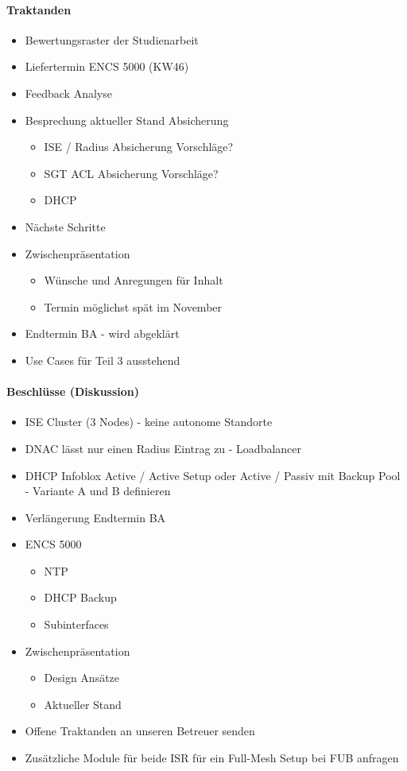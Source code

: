 \paragraph{Traktanden}
\begin{itemize}	
	\item Bewertungsraster der Studienarbeit
	\item Liefertermin ENCS 5000 (KW46)
	\item Feedback Analyse
	\item Besprechung aktueller Stand Absicherung
	\begin{itemize}
		\item ISE / Radius Absicherung Vorschläge?
		\item SGT ACL Absicherung Vorschläge?
		\item DHCP
	\end{itemize}
	\item Nächste Schritte
	\item Zwischenpräsentation 
	\begin{itemize}
		\item Wünsche und Anregungen für Inhalt
		\item Termin möglichst spät im November
	\end{itemize}
	\item Endtermin BA - wird abgeklärt
	\item Use Cases für Teil 3 ausstehend
\end{itemize}

\paragraph{Beschlüsse (Diskussion)}
\begin{itemize}	
	\item ISE Cluster (3 Nodes) - keine autonome Standorte
	\item DNAC lässt nur einen Radius Eintrag zu - Loadbalancer
	\item DHCP Infoblox Active / Active Setup oder Active / Passiv mit Backup Pool - Variante A und B definieren
	\item Verlängerung Endtermin BA
	\item ENCS 5000
	\begin{itemize}
		\item NTP
		\item DHCP Backup
		\item Subinterfaces
	\end{itemize}
	\item Zwischenpräsentation
	\begin{itemize}
		\item Design Ansätze
		\item Aktueller Stand
	\end{itemize}
	\item Offene Traktanden an unseren Betreuer senden
	\item Zusätzliche Module für beide ISR für ein Full-Mesh Setup bei FUB anfragen
\end{itemize}

